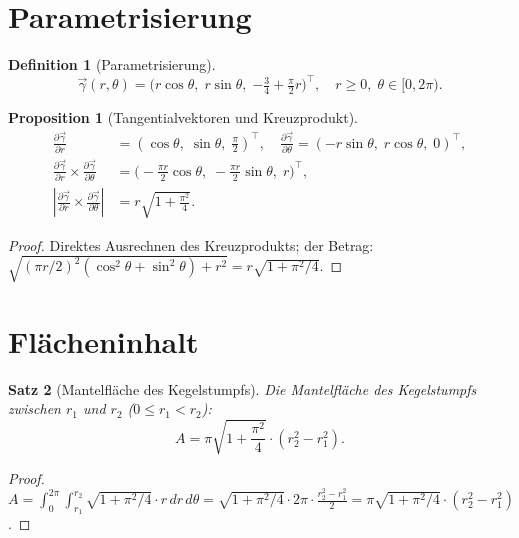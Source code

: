 \documentclass[12pt,a4paper]{article}
\theoremstyle{plain}
\newtheorem{satz}{Satz}[section]
\newtheorem{proposition}[satz]{Proposition}
\theoremstyle{definition}
\newtheorem{definition}{Definition}[section]
\theoremstyle{remark}
\newcommand{\vek}[1]{\vec{#1}}
\begin{document}
\section{Parametrisierung}

\begin{definition}[Parametrisierung]\label{def:param}
\begin{equation}\label{eq:parametrization}
\vek{\gamma}(r,\theta) = \bigl(r\cos\theta,\;r\sin\theta,\;{-\tfrac{3}{4}+\tfrac{\pi}{2}r}\bigr)^\top,
\quad r\geq 0,\;\theta\in[0,2\pi).
\end{equation}
\end{definition}

\begin{proposition}[Tangentialvektoren und Kreuzprodukt]\label{prop:kreuz}
\begin{align*}
\frac{\partial\vek{\gamma}}{\partial r} &= (\cos\theta,\;\sin\theta,\;\tfrac{\pi}{2})^\top,\quad
\frac{\partial\vek{\gamma}}{\partial\theta} = (-r\sin\theta,\;r\cos\theta,\;0)^\top,\\
\frac{\partial\vek{\gamma}}{\partial r}\times\frac{\partial\vek{\gamma}}{\partial\theta}
&= \bigl(-\tfrac{\pi r}{2}\cos\theta,\;-\tfrac{\pi r}{2}\sin\theta,\;r\bigr)^\top,\\
\left|\frac{\partial\vek{\gamma}}{\partial r}\times\frac{\partial\vek{\gamma}}{\partial\theta}\right|
&= r\sqrt{1+\frac{\pi^2}{4}}.
\end{align*}
\end{proposition}

\begin{proof}
Direktes Ausrechnen des Kreuzprodukts; der Betrag:
$\sqrt{(\pi r/2)^2(\cos^2\theta+\sin^2\theta)+r^2} = r\sqrt{1+\pi^2/4}$.
\end{proof}

\section{Fl\"{a}cheninhalt}

\begin{satz}[Mantelfl\"{a}che des Kegelstumpfs]\label{satz:mantelflaeche}
Die Mantelfl\"{a}che des Kegelstumpfs zwischen $r_1$ und $r_2$ ($0\leq r_1<r_2$):
\begin{equation}\label{eq:mantelflaeche}
A = \pi\sqrt{1+\frac{\pi^2}{4}}\cdot(r_2^2 - r_1^2).
\end{equation}
\end{satz}

\begin{proof}
$A = \int_0^{2\pi}\!\int_{r_1}^{r_2}\sqrt{1+\pi^2/4}\cdot r\,dr\,d\theta
= \sqrt{1+\pi^2/4}\cdot 2\pi\cdot\tfrac{r_2^2-r_1^2}{2}
= \pi\sqrt{1+\pi^2/4}\cdot(r_2^2-r_1^2)$.
\end{proof}
\end{document}
